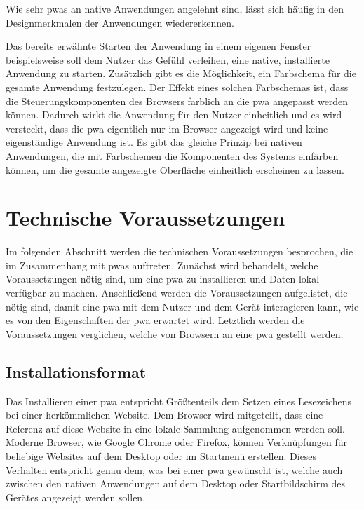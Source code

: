 \documentclass[12pt, parskip=half]{scrartcl}       %
\begin{document}
Wie sehr \acp{pwa} an native Anwendungen angelehnt sind, lässt sich häufig in den Designmerkmalen der Anwendungen wiedererkennen.

Das bereits erwähnte Starten der Anwendung in einem eigenen Fenster beispielsweise soll dem Nutzer das Gefühl verleihen, eine native, installierte Anwendung zu starten.
Zusätzlich gibt es die Möglichkeit, ein Farbschema für die gesamte Anwendung festzulegen.
Der Effekt eines solchen Farbschemas ist, dass die Steuerungskomponenten des Browsers farblich an die \ac{pwa} angepasst werden können.
Dadurch wirkt die Anwendung für den Nutzer einheitlich und es wird versteckt, dass die \ac{pwa} eigentlich nur im Browser angezeigt wird und keine eigenständige Anwendung ist.
Es gibt das gleiche Prinzip bei nativen Anwendungen, die mit Farbschemen die Komponenten des Systems einfärben können, um die gesamte angezeigte Oberfläche einheitlich erscheinen zu lassen.




\section{Technische Voraussetzungen}

Im folgenden Abschnitt werden die technischen Voraussetzungen besprochen, die im Zusammenhang mit \acp{pwa} auftreten.
Zunächst wird behandelt, welche Voraussetzungen nötig sind, um eine \ac{pwa} zu installieren und Daten lokal verfügbar zu machen.
Anschließend werden die Voraussetzungen aufgelistet, die nötig sind, damit eine \ac{pwa} mit dem Nutzer und dem Gerät interagieren kann, wie es von den Eigenschaften der \ac{pwa} erwartet wird.
Letztlich werden die Voraussetzungen verglichen, welche von Browsern an eine \ac{pwa} gestellt werden.

\subsection{Installationsformat}

Das Installieren einer \ac{pwa} entspricht Größtenteils dem Setzen eines Lesezeichens bei einer herkömmlichen Website.
Dem Browser wird mitgeteilt, dass eine Referenz auf diese Website in eine lokale Sammlung aufgenommen werden soll.
Moderne Browser, wie Google Chrome oder Firefox, können Verknüpfungen für beliebige Websites auf dem Desktop oder im Startmenü erstellen\cite{mozillasupport_desktopshortcut}\cite{businessinsider_desktopshortcut_chrome}.
Dieses Verhalten entspricht genau dem, was bei einer \ac{pwa} gewünscht ist, welche auch zwischen den nativen Anwendungen auf dem Desktop oder Startbildschirm des Gerätes angezeigt werden sollen.
\end{document}
